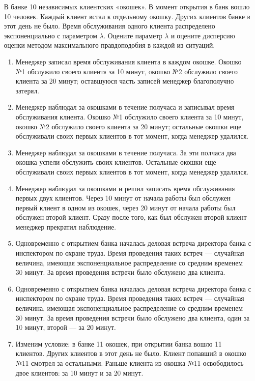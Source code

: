 \documentclass[12pt, a4paper]{article}
\newcounter{problem}[section]
\newenvironment{problem}%
{%
\refstepcounter{problem}%
     \hypertarget{problem:{\thesection.\theproblem}}{} %
     \Writetofile{solution_file}{\protect\hypertarget{soln:\thesection.\theproblem}{}}
     \begin{myenum}[label=\bfseries\protect\hyperlink{soln:\thesection.\theproblem}{\thesection.\theproblem},ref=\thesection.\theproblem]
     \item%
    }%
    {%
    \end{myenum}}
\begin{document}
\begin{problem}
В банке 10 независимых клиентских «окошек». 
В момент открытия в банк вошло 10 человек. 
Каждый клиент встал к отдельному окошку. 
Других клиентов банке в этот день не было. 
Время обслуживания одного клиента распределено экспоненциально с параметром $\lambda$. 
Оцените параметр $\lambda$  и оцените дисперсию оценки методом максимального правдоподобия в каждой из ситуаций. 

\begin{enumerate}
\item Менеджер записал время обслуживания клиента в каждом окошке. 
Окошко №1 обслужило своего клиента за 10 минут, окошко №2 обслужило своего клиента за 20 минут; 
оставшуюся часть записей менеджер благополучно затерял. 
\item Менеджер наблюдал за окошками в течение получаса и записывал время обслуживания клиента. 
Окошко №1 обслужило своего клиента за 10 минут, окошко №2 обслужило своего клиента за 20 минут; 
остальные окошки еще обслуживали своих первых клиентов в тот момент, когда менеджер удалился. 
\item  Менеджер наблюдал за окошками в течение получаса. 
За эти полчаса два окошка успели обслужить своих клиентов. 
Остальные окошки еще обслуживали своих первых клиентов в тот момент, когда менеджер удалился. 
\item Менеджер наблюдал за окошками и решил записать время обслуживания первых двух клиентов. 
Через  10 минут от начала работы был обслужен первый клиент в одном из окошек, 
через 20 минут от начала работы был обслужен второй клиент. 
Сразу после того, как был обслужен второй клиент менеджер прекратил наблюдение. 
\item Одновременно с открытием банка началась деловая встреча директора банка с инспектором по охране труда. 
Время проведения таких встреч — случайная величина, имеющая экспоненциальное распределение со средним временем 30 минут. 
За время проведения встречи было обслужено два клиента. 
\item Одновременно с открытием банка началась деловая встреча директора банка с инспектором по охране труда. 
Время проведения таких встреч — случайная величина, имеющая экспоненциальное распределение со средним временем 30 минут. 
За время проведения встречи было обслужено два клиента, один за 10 минут, второй — за 20 минут. 
\item Изменим условие: в банке 11 окошек, при открытии банка вошло 11 клиентов. Других клиентов в этот день не было. 
Клиент попавший в окошко №11 смотрел за остальными. 
Раньше клиента из окошка  №11 освободилось двое клиентов: за 10 минут и за 20 минут. 
\end{enumerate} 
\begin{sol}
\end{sol}
\end{problem}
\end{document}
